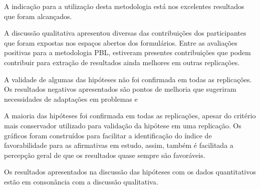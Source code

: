 A indicação para a utilização desta metodologia está
nos excelentes resultados que foram alcançados.

A discussão qualitativa apresentou diversas das contribuições
dos participantes que foram expostas nos espaços abertos dos
formulários.
Entre as avaliações positivas para a metodologia \ac{PBL},
estiveram presentes contribuições que podem contribuir para
extração de resultados ainda melhores em outras replicações.

A validade de algumas das hipóteses não foi confirmada
em todas as replicações.
Os resultados negativos apresentados são pontos de
melhoria que sugeriram necessidades de adaptações
em problemas e

A maioria das hipóteses foi confirmada em todas as replicações,
apesar do critério mais conservador utilizado para validação da
hipótese em uma replicação.
Os gráficos foram construídos para facilitar a identificação
do índice de favorabilidade para as afirmativas em estudo, assim,
também é facilitada a percepção geral de que os resultados quase
sempre são favoráveis.

Os resultados apresentados na discussão das hipóteses com
os dados quantitativos estão em consonância com a discussão
qualitativa.
